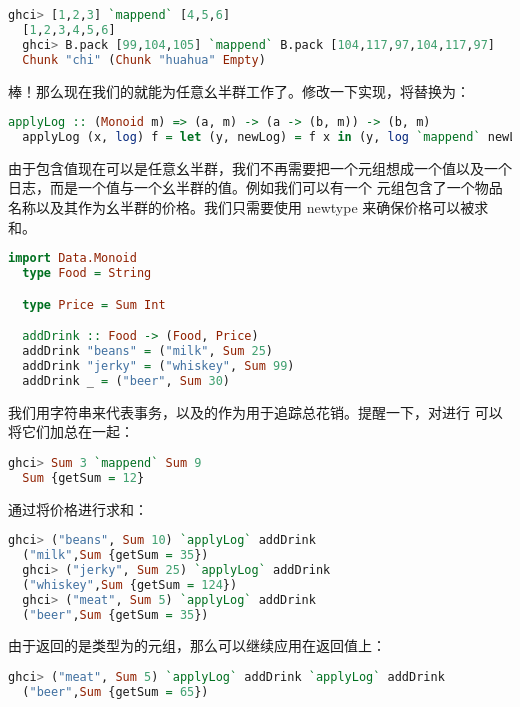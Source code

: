 \documentclass[./main.tex]{subfiles}
\begin{document}
\begin{lstlisting}[language=Haskell]
  ghci> [1,2,3] `mappend` [4,5,6]
  [1,2,3,4,5,6]
  ghci> B.pack [99,104,105] `mappend` B.pack [104,117,97,104,117,97]
  Chunk "chi" (Chunk "huahua" Empty)
\end{lstlisting}

棒！那么现在我们的就能为任意幺半群工作了。修改一下实现，将\acode{++}替换为：

\begin{lstlisting}[language=Haskell]
  applyLog :: (Monoid m) => (a, m) -> (a -> (b, m)) -> (b, m)
  applyLog (x, log) f = let (y, newLog) = f x in (y, log `mappend` newLog)
\end{lstlisting}

由于包含值现在可以是任意幺半群，我们不再需要把一个元组想成一个值以及一个日志，而是一个值与一个幺半群的值。例如我们可以有一个
元组包含了一个物品名称以及其作为幺半群的价格。我们只需要使用 newtype 来确保价格可以被求和。

\begin{lstlisting}[language=Haskell]
  import Data.Monoid
  type Food = String

  type Price = Sum Int

  addDrink :: Food -> (Food, Price)
  addDrink "beans" = ("milk", Sum 25)
  addDrink "jerky" = ("whiskey", Sum 99)
  addDrink _ = ("beer", Sum 30)
\end{lstlisting}

我们用字符串来代表事务，以及的作为用于追踪总花销。提醒一下，对进行
可以将它们加总在一起：

\begin{lstlisting}[language=Haskell]
  ghci> Sum 3 `mappend` Sum 9
  Sum {getSum = 12}
\end{lstlisting}

通过将价格进行求和：

\begin{lstlisting}[language=Haskell]
  ghci> ("beans", Sum 10) `applyLog` addDrink
  ("milk",Sum {getSum = 35})
  ghci> ("jerky", Sum 25) `applyLog` addDrink
  ("whiskey",Sum {getSum = 124})
  ghci> ("meat", Sum 5) `applyLog` addDrink
  ("beer",Sum {getSum = 35})
\end{lstlisting}

由于返回的是类型为的元组，那么可以继续应用在返回值上：

\begin{lstlisting}[language=Haskell]
  ghci> ("meat", Sum 5) `applyLog` addDrink `applyLog` addDrink
  ("beer",Sum {getSum = 65})
\end{lstlisting}
\end{document}
